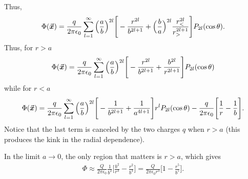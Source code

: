 {Thus,
\begin{eqnarray}
    \Phi(\va*{x}) = \frac{q}{2 \pi \epsilon_0} \sum_{l=1}^{\infty} \Big( \frac{a}{b} \Big)^{2l} \Bigg[ -\frac{r^{2l}}{b^{2l+1}} + \Big( \frac{b}{a} \Big)^{2l} \frac{r_{<}^{2l}}{r_{>}^{2l+1}} \Bigg] P_{2l}(\cos{\theta})
.\end{eqnarray}
Thus, for $r > a$
\begin{eqnarray}
    \Phi(\va*{x}) = \frac{q}{2 \pi \epsilon_0} \sum_{l=1}^{\infty} \Big( \frac{a}{b} \Big)^{2l} \Bigg[ -\frac{r^{2l}}{b^{2l+1}} + \frac{b^{2l}}{r^{2l+1}} \Bigg] P_{2l}(\cos{\theta})
\end{eqnarray}
while for $r < a$
\begin{eqnarray}
    \Phi(\va*{x}) = \frac{q}{2 \pi \epsilon_0} \sum_{l=1}^{\infty} \Big( \frac{a}{b} \Big)^{2l} \Bigg[ -\frac{1}{b^{2l+1}} + \frac{1}{a^{4l+1}} \Bigg] r^{l} P_{2l}(\cos{\theta}) - \frac{q}{2 \pi \epsilon_0} \Bigg[ \frac{1}{r} - \frac{1}{b} \Bigg]
.\end{eqnarray}
Notice that the last term is canceled by the two charges $q$ when $r > a$ (this produces the kink in the radial dependence).

In the limit $a \rightarrow 0$, the only region that matters is $r > a$, which gives
\begin{eqnarray}
    \Phi \approx \frac{Q}{2\pi\epsilon_0} \frac{1}{b^2} \Big[ \frac{b^{2}}{r^{3}} - \frac{r^{2}}{b^{3}} \Big] = \frac{Q}{2\pi\epsilon_0 r^3} \Big[ 1 - \frac{r^{5}}{b^{5}} \Big]
.\end{eqnarray}

}




